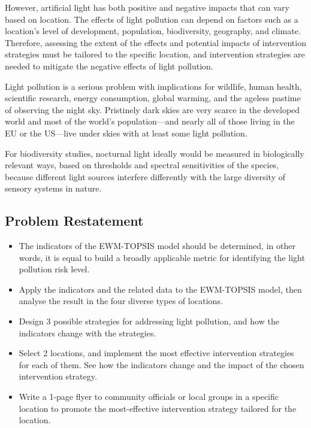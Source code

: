 However, artificial light has both positive and negative impacts that can vary based on location. The effects of light pollution can depend on factors such as a location's level of development, population, biodiversity, geography, and climate. Therefore, assessing the extent of the effects and potential impacts of intervention strategies must be tailored to the specific location, and intervention strategies are needed to mitigate the negative effects of light pollution.

Light pollution is a serious problem with implications for wildlife, human health, scientific research, energy consumption, global warming, and the ageless pastime of observing the night sky. Pristinely dark skies are very scarce in the developed world and most of the world's population—and nearly all of those living in the EU or the US—live under skies with at least some light pollution\cite{GALLAWAY2010658}. 

For biodiversity studies, nocturnal light ideally would be measured in biologically relevant ways, based on thresholds and spectral sensitivities of the species, because different light sources interfere differently with the large diversity of sensory systems in nature\cite{davies2013artificial}.

\subsection{Problem Restatement}
\begin{itemize}
    \item The indicators of the EWM-TOPSIS model should be determined, in other words, it is equal to build a broadly applicable metric for identifying the light pollution risk level.
    \item Apply the indicators and the related data to the EWM-TOPSIS model, then analyse the result in the four diverse types of locations.
    \item Design 3 possible strategies for addressing light pollution, and how the indicators change with the strategies.
    \item Select 2 locations, and implement the most effective intervention strategies for each of them. See how the indicators change and the impact of the chosen intervention strategy.
    \item Write a 1-page flyer to community officials or local groups in a specific location to promote the most-effective intervention strategy tailored for the location.
\end{itemize}


